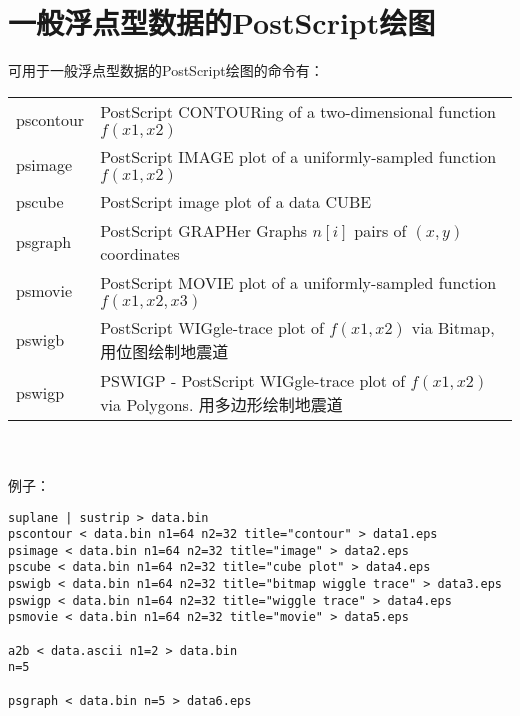 \section{一般浮点型数据的PostScript绘图}
可用于一般浮点型数据的PostScript绘图的命令有：\\
\begin{tabular}{lp{}}
	\toprule
pscontour & PostScript CONTOURing of a two-dimensional function$f(x1,x2)$\\
psimage & PostScript IMAGE plot of a uniformly-sampled function $f(x1,x2)$\\
pscube & PostScript image plot of a data CUBE\\
psgraph & PostScript GRAPHer Graphs $n[i]$ pairs of $(x,y)$ coordinates\\
psmovie & PostScript MOVIE plot of a uniformly-sampled function $f(x1,x2,x3)$\\
pswigb & PostScript WIGgle-trace plot of $f(x1,x2)$ via Bitmap, 用位图绘制地震道\\
pswigp & PSWIGP - PostScript WIGgle-trace plot of $f(x1,x2)$ via Polygons. 用多边形绘制地震道\\
\bottomrule
\end{tabular}\\\\
例子：
\begin{lstlisting}
suplane | sustrip > data.bin
pscontour < data.bin n1=64 n2=32 title="contour" > data1.eps
psimage < data.bin n1=64 n2=32 title="image" > data2.eps
pscube < data.bin n1=64 n2=32 title="cube plot" > data4.eps
pswigb < data.bin n1=64 n2=32 title="bitmap wiggle trace" > data3.eps
pswigp < data.bin n1=64 n2=32 title="wiggle trace" > data4.eps
psmovie < data.bin n1=64 n2=32 title="movie" > data5.eps

a2b < data.ascii n1=2 > data.bin
n=5

psgraph < data.bin n=5 > data6.eps
\end{lstlisting}

